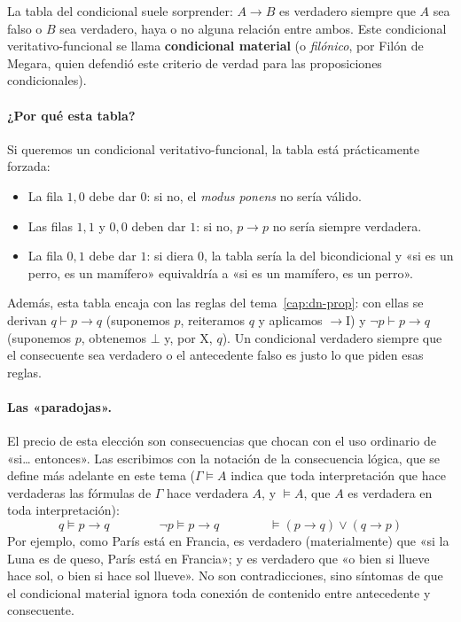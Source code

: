La tabla del condicional suele sorprender: $A \to B$ es verdadero siempre que $A$ sea falso o $B$ sea verdadero, haya o no alguna relación entre ambos. Este condicional veritativo-funcional se llama \textbf{condicional material} (o \emph{filónico}, por Filón de Megara, quien defendió este criterio de verdad para las proposiciones condicionales).

\paragraph{¿Por qué esta tabla?} Si queremos un condicional veritativo-funcional, la tabla está prácticamente forzada:
\begin{itemize}
    \item La fila $1, 0$ debe dar $0$: si no, el \emph{modus ponens} no sería válido.
    \item Las filas $1, 1$ y $0, 0$ deben dar $1$: si no, $p \to p$ no sería siempre verdadera.
    \item La fila $0, 1$ debe dar $1$: si diera $0$, la tabla sería la del bicondicional y «si es un perro, es un mamífero» equivaldría a «si es un mamífero, es un perro».
\end{itemize}
Además, esta tabla encaja con las reglas del tema~\ref{cap:dn-prop}: con ellas se derivan $q \vdash p \to q$ (suponemos $p$, reiteramos $q$ y aplicamos $\to$I) y $\neg p \vdash p \to q$ (suponemos $p$, obtenemos $\bot$ y, por X, $q$). Un condicional verdadero siempre que el consecuente sea verdadero o el antecedente falso es justo lo que piden esas reglas.

\paragraph{Las «paradojas».} El precio de esta elección son consecuencias que chocan con el uso ordinario de «si\ldots{} entonces». Las escribimos con la notación de la consecuencia lógica, que se define más adelante en este tema ($\Gamma \models A$ indica que toda interpretación que hace verdaderas las fórmulas de $\Gamma$ hace verdadera $A$, y $\models A$, que $A$ es verdadera en toda interpretación):
\[
q \models p \to q \qquad\qquad \neg p \models p \to q \qquad\qquad \models (p \to q) \lor (q \to p)
\]
Por ejemplo, como París está en Francia, es verdadero (materialmente) que «si la Luna es de queso, París está en Francia»; y es verdadero que «o bien si llueve hace sol, o bien si hace sol llueve». No son contradicciones, sino síntomas de que el condicional material ignora toda conexión de contenido entre antecedente y consecuente.

